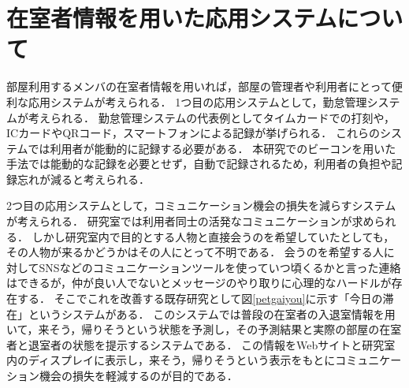 
\section{在室者情報を用いた応用システムについて}\label{3.4}
部屋利用するメンバの在室者情報を用いれば，部屋の管理者や利用者にとって便利な応用システムが考えられる．
1つ目の応用システムとして，勤怠管理システムが考えられる．
勤怠管理システムの代表例としてタイムカードでの打刻や，ICカードやQRコード，スマートフォンによる記録が挙げられる．
これらのシステムでは利用者が能動的に記録する必要がある．
本研究でのビーコンを用いた手法では能動的な記録を必要とせず，自動で記録されるため，利用者の負担や記録忘れが減ると考えられる．

2つ目の応用システムとして，コミュニケーション機会の損失を減らすシステムが考えられる．
研究室では利用者同士の活発なコミュニケーションが求められる．
しかし研究室内で目的とする人物と直接会うのを希望していたとしても，その人物が来るかどうかはその人にとって不明である．
会うのを希望する人に対してSNSなどのコミュニケーションツールを使っていつ頃くるかと言った連絡はできるが，仲が良い人でないとメッセージのやり取りに心理的なハードルが存在する．
そこでこれを改善する既存研究として図\ref{petgaiyou}に示す「今日の滞在」というシステムがある．
このシステムでは普段の在室者の入退室情報を用いて，来そう，帰りそうという状態を予測し，その予測結果と実際の部屋の在室者と退室者の状態を提示するシステムである．
この情報をWebサイトと研究室内のディスプレイに表示し，来そう，帰りそうという表示をもとにコミュニケーション機会の損失を軽減するのが目的である．

